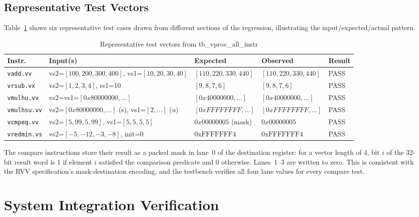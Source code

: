 \subsection{Representative Test Vectors}

Table~\ref{tab:rep_vectors} shows six representative test cases drawn from different
sections of the regression, illustrating the input/expected/actual pattern.

\begin{table}[H]
  \centering
  \caption{Representative test vectors from tb\_vproc\_all\_instr}
  \label{tab:rep_vectors}
  \begin{tabular}{lllll}
    \toprule
    \textbf{Instr.} & \textbf{Input(s)} & \textbf{Expected} & \textbf{Observed} & \textbf{Result} \\
    \midrule
    \texttt{vadd.vv}
      & vs2=$[100,200,300,400]$, vs1=$[10,20,30,40]$
      & $[110,220,330,440]$ & $[110,220,330,440]$ & PASS \\
    \texttt{vrsub.vx}
      & vs2=$[1,2,3,4]$, rs1=10
      & $[9,8,7,6]$ & $[9,8,7,6]$ & PASS \\
    \texttt{vmulhu.vv}
      & vs2=vs1=$[0x80000000,\ldots]$
      & $[0x40000000,\ldots]$ & $[0x40000000,\ldots]$ & PASS \\
    \texttt{vmulhsu.vv}
      & vs2=$[0x80000000,\ldots]$ (s), vs1=$[2,\ldots]$ (u)
      & $[0xFFFFFFFF,\ldots]$ & $[0xFFFFFFFF,\ldots]$ & PASS \\
    \texttt{vcmpeq.vv}
      & vs2=$[5,99,5,99]$, vs1=$[5,5,5,5]$
      & $0x00000005$ (mask) & $0x00000005$ & PASS \\
    \texttt{vredmin.vs}
      & vs2=$[-5,-12,-3,-8]$, init=0
      & $0\mathrm{xFFFFFFF4}$ & $0\mathrm{xFFFFFFF4}$ & PASS \\
    \bottomrule
  \end{tabular}
\end{table}

The compare instructions store their result as a packed mask in lane~0 of the
destination register: for a vector length of 4, bit $i$ of the 32-bit result word
is 1 if element $i$ satisfied the comparison predicate and 0 otherwise. Lanes~1--3
are written to zero. This is consistent with the RVV specification's mask-destination
encoding, and the testbench verifies all four lane values for every compare test.

\section{System Integration Verification}
\label{sec:system_verif}

